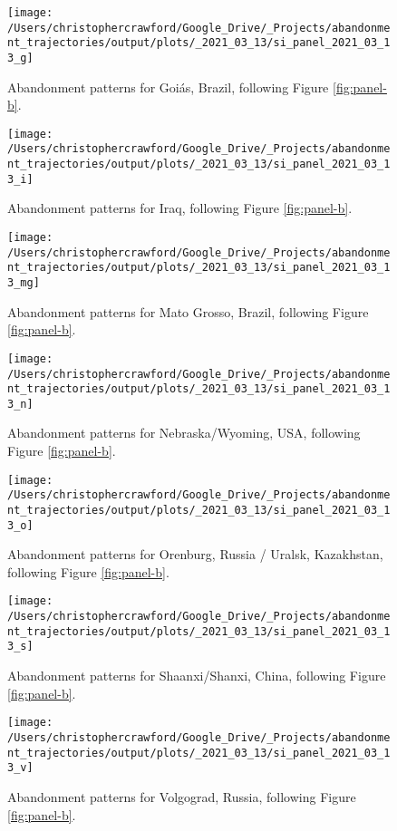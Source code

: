 \documentclass[9pt,twoside,lineno]{pnas-new}
\begin{document}
\begin{figure}
\texttt{[image: /Users/christophercrawford/Google\_Drive/\_Projects/abandonment\_trajectories/output/plots/\_2021\_03\_13/si\_panel\_2021\_03\_13\_g]} \caption{Abandonment patterns for Goiás, Brazil, following Figure \ref{fig:panel-b}.}\label{fig:panel-g}
\end{figure}

\begin{figure}
\texttt{[image: /Users/christophercrawford/Google\_Drive/\_Projects/abandonment\_trajectories/output/plots/\_2021\_03\_13/si\_panel\_2021\_03\_13\_i]} \caption{Abandonment patterns for Iraq, following Figure \ref{fig:panel-b}.}\label{fig:panel-i}
\end{figure}

\begin{figure}
\texttt{[image: /Users/christophercrawford/Google\_Drive/\_Projects/abandonment\_trajectories/output/plots/\_2021\_03\_13/si\_panel\_2021\_03\_13\_mg]} \caption{Abandonment patterns for Mato Grosso, Brazil, following Figure \ref{fig:panel-b}.}\label{fig:panel-mg}
\end{figure}

\begin{figure}
\texttt{[image: /Users/christophercrawford/Google\_Drive/\_Projects/abandonment\_trajectories/output/plots/\_2021\_03\_13/si\_panel\_2021\_03\_13\_n]} \caption{Abandonment patterns for Nebraska/Wyoming, USA, following Figure \ref{fig:panel-b}.}\label{fig:panel-n}
\end{figure}

\begin{figure}
\texttt{[image: /Users/christophercrawford/Google\_Drive/\_Projects/abandonment\_trajectories/output/plots/\_2021\_03\_13/si\_panel\_2021\_03\_13\_o]} \caption{Abandonment patterns for Orenburg, Russia / Uralsk, Kazakhstan, following Figure \ref{fig:panel-b}.}\label{fig:panel-o}
\end{figure}

\begin{figure}
\texttt{[image: /Users/christophercrawford/Google\_Drive/\_Projects/abandonment\_trajectories/output/plots/\_2021\_03\_13/si\_panel\_2021\_03\_13\_s]} \caption{Abandonment patterns for Shaanxi/Shanxi, China, following Figure \ref{fig:panel-b}.}\label{fig:panel-s}
\end{figure}

\begin{figure}
\texttt{[image: /Users/christophercrawford/Google\_Drive/\_Projects/abandonment\_trajectories/output/plots/\_2021\_03\_13/si\_panel\_2021\_03\_13\_v]} \caption{Abandonment patterns for Volgograd, Russia, following Figure \ref{fig:panel-b}.}\label{fig:panel-v}
\end{figure}
\end{document}
